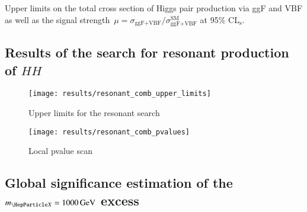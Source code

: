 


\begin{table}[htbp]
  \centering

  

  \caption{Upper limits on the total cross section of Higgs pair
    production via ggF and VBF as well as the signal
    strength~$\mu = \sigma_\text{ggF+VBF} /
    \sigma_\text{ggF+VBF}^\text{SM}$ at 95\% $\text{CL}_\text{s}$.}
  \label{tab:limits_non_resonant}
\end{table}


\subsection{Results of the search for resonant production of $HH$}
\label{sec:results_res}




\begin{figure}[htbp]
  \centering

  \texttt{[image: results/resonant\_comb\_upper\_limits]}

  \caption{Upper limits for the resonant search}
  \label{fig:res_upper_limits}
\end{figure}

\begin{figure}[htbp]
  \centering

  \texttt{[image: results/resonant\_comb\_pvalues]}

  \caption{Local pvalue scan}
  \label{fig:local_pvalues}
\end{figure}

\subsection{Global significance estimation of the $\mX = \SI{1000}{\GeV}$ excess}

